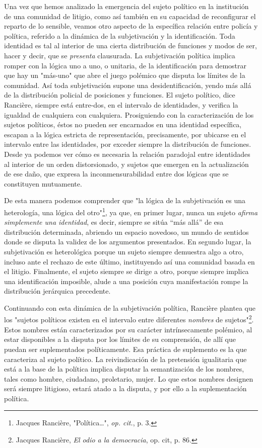 Una vez que hemos analizado la emergencia del sujeto político en la
institución de una comunidad de litigio, como así también en su
capacidad de reconfigurar el reparto de lo sensible, veamos otro aspecto
de la específica relación entre policía y política, referido a la
dinámica de la subjetivación y la identificación. Toda identidad es tal
al interior de una cierta distribución de funciones y modos de ser,
hacer y decir, que se \emph{presenta} clausurada. La subjetivación
política implica romper con la lógica uno a uno, o unitaria, de la
identificación para demostrar que hay un "más-uno" que abre el juego
polémico que disputa los límites de la comunidad. Así toda subjetivación
supone una desidentificación, yendo más allá de la distribución policial
de posiciones y funciones. El sujeto político, dice Rancière, siempre
está entre-dos, en el intervalo de identidades, y verifica la igualdad
de cualquiera con cualquiera. Prosiguiendo con la caracterización de los
sujetos políticos, éstos no pueden ser encarnados en una identidad
específica, escapan a la lógica estricta de representación,
precisamente, por ubicarse en el intervalo entre las identidades, por
exceder siempre la distribución de funciones. Desde ya podemos ver cómo
es necesaria la relación paradojal entre identidades al interior de un
orden distorsionado, y sujetos que emergen en la actualización de ese
daño, que expresa la inconmensurabilidad entre dos lógicas que se
constituyen mutuamente.

De esta manera podemos comprender que "la lógica de la subjetivación es
una heterología, una lógica del otro"\footnote{Jacques Rancière,
  "Política\ldots", \emph{op. cit.}, p. 3.}, ya que, en primer lugar,
nunca un sujeto \emph{afirma simplemente una identidad}, es decir,
siempre se sitúa ``más allá'' de esa distribución determinada, abriendo
un espacio novedoso, un mundo de sentidos donde se disputa la validez de
los argumentos presentados. En segundo lugar, la subjetivación es
heterológica porque un sujeto siempre demuestra algo a otro, incluso
ante el rechazo de este último, instituyendo así una comunidad basada en
el litigio. Finalmente, el sujeto siempre se dirige a otro, porque
siempre implica una identificación imposible, alude a una posición cuya
manifestación rompe la distribución jerárquica precedente.

Continuando con esta dinámica de la subjetivación política, Rancière
plantea que los "sujetos políticos existen en el intervalo entre
diferentes \emph{nombres} de sujetos"\footnote{Jacques Rancière,
  \emph{El odio a la democracia}, op. cit, p. 86.}. Estos nombres están
caracterizados por su carácter intrínsecamente polémico, al estar
disponibles a la disputa por los límites de su comprensión, de allí que
puedan ser suplementados políticamente. Esa práctica de suplemento es la
que caracteriza al sujeto político. La reivindicación de la pretensión
igualitaria que está a la base de la política implica disputar la
semantización de los nombres, tales como hombre, ciudadano, proletario,
mujer. Lo que estos nombres designen será siempre litigioso, estará
atado a la disputa, y por ello a la suplementación política.

